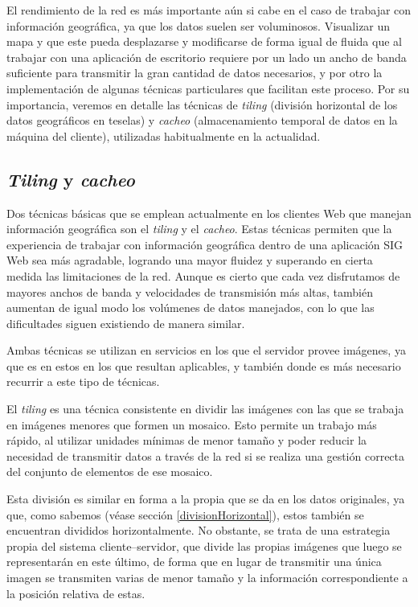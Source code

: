 El rendimiento de la red es más importante aún si cabe en el caso de trabajar con información geográfica, ya que los datos suelen ser voluminosos. Visualizar un mapa y que este pueda desplazarse y modificarse de forma igual de fluida que al trabajar con una aplicación de escritorio requiere por un lado un ancho de banda suficiente para transmitir la gran cantidad de datos necesarios, y por otro la implementación de algunas técnicas particulares que facilitan este proceso. Por su importancia, veremos en detalle las técnicas de \emph{tiling} (división horizontal de los datos geográficos en teselas) y \emph{cacheo} (almacenamiento temporal de datos en la máquina del cliente), utilizadas habitualmente en la actualidad.

\subsection{\emph{Tiling} y \emph{cacheo}}


Dos técnicas básicas que se emplean actualmente en los clientes Web que manejan información geográfica son el \emph{tiling} y el \emph{cacheo}. Estas técnicas permiten que la experiencia de trabajar con información geográfica dentro de una aplicación SIG Web sea más agradable, logrando una mayor fluidez y superando en cierta medida las limitaciones de la red. Aunque es cierto que cada vez disfrutamos de mayores anchos de banda y velocidades de transmisión más altas, también aumentan de igual modo los volúmenes de datos manejados, con lo que las dificultades siguen existiendo de manera similar.

Ambas técnicas se utilizan en servicios en los que el servidor provee imágenes, ya que es en estos en los que resultan aplicables, y también donde es más necesario recurrir a este tipo de técnicas.

El \emph{tiling} es una técnica consistente en dividir las imágenes con las que se trabaja en imágenes menores que formen un mosaico. Esto permite un trabajo más rápido, al utilizar unidades mínimas de menor tamaño y poder reducir la necesidad de transmitir datos a través de la red si se realiza una gestión correcta del conjunto de elementos de ese mosaico.

Esta división es similar en forma a la propia que se da en los datos originales, ya que, como sabemos (véase sección \ref{divisionHorizontal}), estos también se encuentran divididos horizontalmente. No obstante, se trata de una estrategia propia del sistema cliente--servidor, que divide las propias imágenes que luego se representarán en este último, de forma que en lugar de transmitir una única imagen se transmiten varias de menor tamaño y la información correspondiente a la posición relativa de estas.

